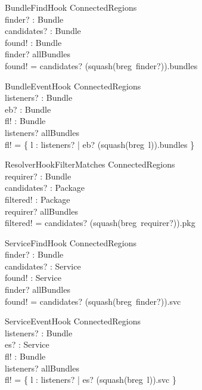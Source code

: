 \documentclass[a4paper,9pt]{article}
\begin{document}
\begin{schema}{BundleFindHook}
  \Xi ConnectedRegions \\
  finder? : Bundle \\
  candidates? : \power Bundle \\
  found! : \power Bundle \\
\where
  finder? \in allBundles \\
  found! = candidates? \cap (squash(breg~finder?)).bundles \\
\end{schema}

\begin{schema}{BundleEventHook}
  \Xi ConnectedRegions \\
  listeners? : \power Bundle \\
  eb? : Bundle \\
  fl! : \power Bundle \\
\where
  listeners? \subseteq allBundles \\
  fl! = \{ l : listeners? | eb? \in (squash(breg~l)).bundles \} \\
\end{schema}

\begin{schema}{ResolverHookFilterMatches}
  \Xi ConnectedRegions \\
  requirer? : Bundle \\
  candidates? : \power Package \\
  filtered! : \power Package \\
\where
  requirer? \in allBundles \\
  filtered! = candidates? \cap (squash(breg~requirer?)).pkg \\
\end{schema}

\begin{schema}{ServiceFindHook}
  \Xi ConnectedRegions \\
  finder? : Bundle \\
  candidates? : \power Service \\
  found! : \power Service \\
\where
  finder? \in allBundles \\
  found! = candidates? \cap (squash(breg~finder?)).svc \\
\end{schema}

\begin{schema}{ServiceEventHook}
  \Xi ConnectedRegions \\
  listeners? : \power Bundle \\
  es? : Service \\
  fl! : \power Bundle \\
\where
  listeners? \subseteq allBundles \\
  fl! = \{ l : listeners? | es? \in (squash(breg~l)).svc \} \\
\end{schema}
\end{document}
